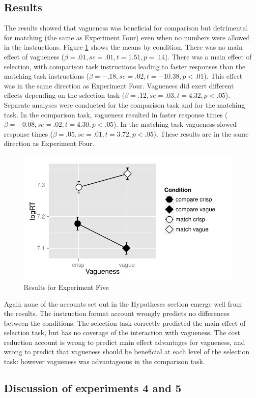 \documentclass[doc,apacite]{apa6}
\begin{document}
\subsection{Results}
The results showed that vagueness was beneficial for comparison but detrimental for matching (the same as Experiment Four) even when no numbers were allowed in the instructions. Figure \ref{resultse5} shows the means by condition. There was no main effect of vagueness ($\beta=.01, se=.01, t=1.51, p=.14$). There was a main effect of selection, with comparison task instructions leading to faster responses than the matching task instructions ($\beta=-.18, se=.02, t=-10.38, p<.01$). This effect was in the same direction as Experiment Four. Vagueness did  exert different effects depending on the selection task ($\beta=.12, se=.03, t=4.32, p<.05$). Separate analyses were conducted for the comparison task and for the matching task. In the comparison task, vagueness resulted in faster response times ($\beta=-0.08, se=.02, t=4.30, p<.05$). In the matching task vagueness slowed response times ($\beta=.05, se=.01, t=3.72, p<.05$). These results are in the same direction as Experiment Four.

\begin{figure}[htbp]
\includegraphics[width=.5\textwidth]{images/resultse5.pdf}
\caption{Results for Experiment Five}
\label{resultse5}
\end{figure}

Again none of the accounts set out in the Hypotheses section emerge well from the results. The instruction format account wrongly predicts no differences between the conditions. The selection task correctly predicted the main effect of selection task, but has no coverage of the interaction with vagueness. The cost reduction account is wrong to predict main effect advantages for vagueness, and wrong to predict that vagueness should be beneficial at each level of the selection task: however vagueness was advantageous in the comparison task.

\subsection{Discussion of experiments 4 and 5}
\end{document}
